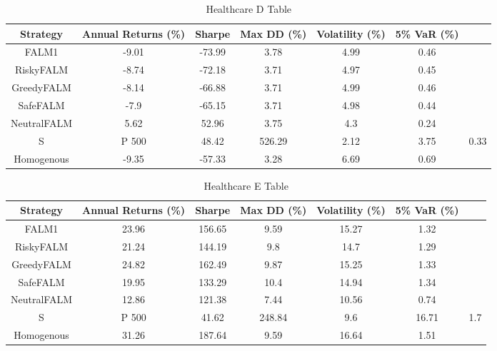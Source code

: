 \begin{table}[]
    \centering
    \caption{Healthcare D Table}
    \begin{tabular}{|c|c|c|c|c|c|c|}
        \hline
        Strategy & Annual Returns (\%) & Sharpe & Max \ac{DD} (\%) & Volatility (\%)& 5\% \ac{VaR} (\%) \\
        \hline
        FALM1 & -9.01 & -73.99 & 3.78 & 4.99 & 0.46 \\
        RiskyFALM & -8.74 & -72.18 & 3.71 & 4.97 & 0.45 \\
        GreedyFALM & -8.14 & -66.88 & 3.71 & 4.99 & 0.46 \\
        SafeFALM & -7.9 & -65.15 & 3.71 & 4.98 & 0.44 \\
        NeutralFALM & 5.62 & 52.96 & 3.75 & 4.3 & 0.24 \\
        S&P 500 & 48.42 & 526.29 & 2.12 & 3.75 & 0.33 \\
        Homogenous & -9.35 & -57.33 & 3.28 & 6.69 & 0.69 \\
        \hline
    \end{tabular}
    \label{tab:healthcare_d_table}
\end{table}

\begin{table}[]
    \centering
    \caption{Healthcare E Table}
    \begin{tabular}{|c|c|c|c|c|c|c|}
        \hline
        Strategy & Annual Returns (\%) & Sharpe & Max \ac{DD} (\%) & Volatility (\%)& 5\% \ac{VaR} (\%) \\
        \hline
        FALM1 & 23.96 & 156.65 & 9.59 & 15.27 & 1.32 \\
        RiskyFALM & 21.24 & 144.19 & 9.8 & 14.7 & 1.29 \\
        GreedyFALM & 24.82 & 162.49 & 9.87 & 15.25 & 1.33 \\
        SafeFALM & 19.95 & 133.29 & 10.4 & 14.94 & 1.34 \\
        NeutralFALM & 12.86 & 121.38 & 7.44 & 10.56 & 0.74 \\
        S&P 500 & 41.62 & 248.84 & 9.6 & 16.71 & 1.7 \\
        Homogenous & 31.26 & 187.64 & 9.59 & 16.64 & 1.51 \\
        \hline
    \end{tabular}
    \label{tab:healthcare_e_table}
\end{table}

